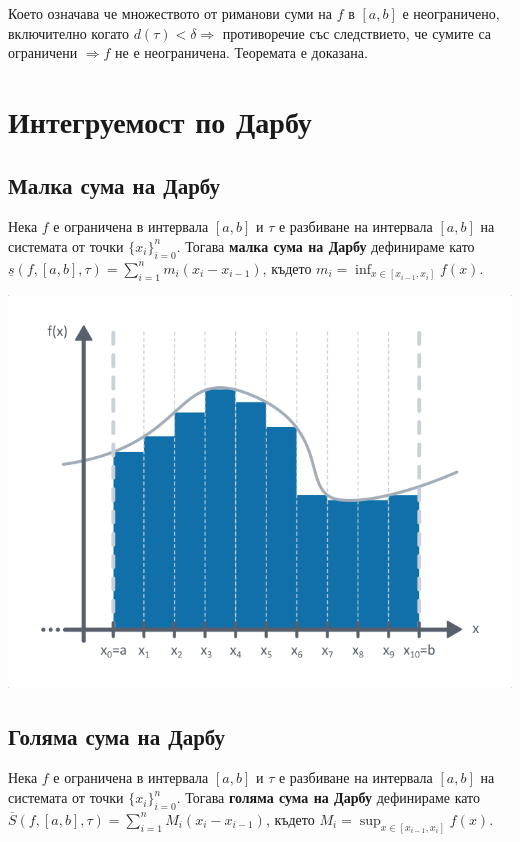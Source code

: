 \documentclass[fleqn,12pt]{article}
\begin{document}
Което означава че множеството от риманови суми на $f$ в $[a,b]$ е неограничено, включително когато $d(\tau)<\delta \Rightarrow$ противоречие 
със следствието, че сумите са ограничени $\Rightarrow f$ не е неограничена.
Теоремата е доказана. 

\section{Интегруемост по Дарбу}
\subsection{Малка сума на Дарбу}
Нека $f$ е ограничена в интервала $[a,b]$ и $\tau$ е разбиване на интервала $[a,b]$ на системата от точки $\{x_i\}_{i=0}^{n}$.
Тогава \textbf{малка сума на Дарбу} дефинираме като $\underline{s}(f,[a,b],\tau)=\sum_{i=1}^{n} m_i(x_i-x_{i-1})$, където $m_i=\inf_{x\in[x_{i-1},x_i]}f(x)$.

\includegraphics[width=175mm]{darboux_lower_sum.png}


\subsection{Голяма сума на Дарбу}
Нека $f$ е ограничена в интервала $[a,b]$ и $\tau$ е разбиване на интервала $[a,b]$ на системата от точки $\{x_i\}_{i=0}^{n}$.
Тогава \textbf{голяма сума на Дарбу} дефинираме като $\overline{S}(f,[a,b],\tau)=\sum_{i=1}^{n} M_i(x_i-x_{i-1})$, където $M_i=\sup_{x\in[x_{i-1},x_i]}f(x)$.
\end{document}
